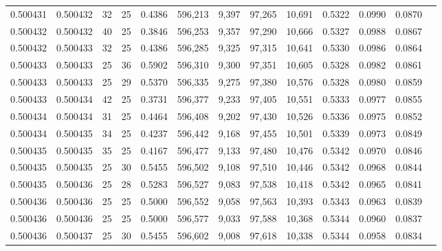 \begin{tabular}{rrrrrrrrrrrrr}
0.500431 & 0.500432 &    32 &  25 &                                     0.4386 & 596,213 &   9,397 &  97,265 &  10,691 & 0.5322 & 0.0990 & 0.0870 \\
0.500432 & 0.500432 &    40 &  25 &                                     0.3846 & 596,253 &   9,357 &  97,290 &  10,666 & 0.5327 & 0.0988 & 0.0867 \\
0.500432 & 0.500433 &    32 &  25 &                                     0.4386 & 596,285 &   9,325 &  97,315 &  10,641 & 0.5330 & 0.0986 & 0.0864 \\
0.500433 & 0.500433 &    25 &  36 &                                     0.5902 & 596,310 &   9,300 &  97,351 &  10,605 & 0.5328 & 0.0982 & 0.0861 \\
0.500433 & 0.500433 &    25 &  29 &                                     0.5370 & 596,335 &   9,275 &  97,380 &  10,576 & 0.5328 & 0.0980 & 0.0859 \\
0.500433 & 0.500434 &    42 &  25 &                                     0.3731 & 596,377 &   9,233 &  97,405 &  10,551 & 0.5333 & 0.0977 & 0.0855 \\
0.500434 & 0.500434 &    31 &  25 &                                     0.4464 & 596,408 &   9,202 &  97,430 &  10,526 & 0.5336 & 0.0975 & 0.0852 \\
0.500434 & 0.500435 &    34 &  25 &                                     0.4237 & 596,442 &   9,168 &  97,455 &  10,501 & 0.5339 & 0.0973 & 0.0849 \\
0.500435 & 0.500435 &    35 &  25 &                                     0.4167 & 596,477 &   9,133 &  97,480 &  10,476 & 0.5342 & 0.0970 & 0.0846 \\
0.500435 & 0.500435 &    25 &  30 &                                     0.5455 & 596,502 &   9,108 &  97,510 &  10,446 & 0.5342 & 0.0968 & 0.0844 \\
0.500435 & 0.500436 &    25 &  28 &                                     0.5283 & 596,527 &   9,083 &  97,538 &  10,418 & 0.5342 & 0.0965 & 0.0841 \\
0.500436 & 0.500436 &    25 &  25 &                                     0.5000 & 596,552 &   9,058 &  97,563 &  10,393 & 0.5343 & 0.0963 & 0.0839 \\
0.500436 & 0.500436 &    25 &  25 &                                     0.5000 & 596,577 &   9,033 &  97,588 &  10,368 & 0.5344 & 0.0960 & 0.0837 \\
0.500436 & 0.500437 &    25 &  30 &                                     0.5455 & 596,602 &   9,008 &  97,618 &  10,338 & 0.5344 & 0.0958 & 0.0834 \\

\end{tabular}
